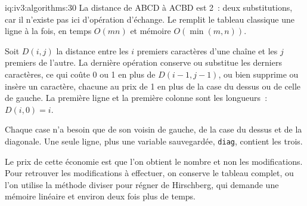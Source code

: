 \begin{solution}{iq:iv3:algorithms:30}
La distance de ABCD à ACBD est 2~: deux substitutions, car il n'existe pas ici d'opération d'échange. Le  remplit le tableau classique une ligne à la fois, en temps $O(mn)$ et mémoire $O(\min(m, n))$.
\label{lst:iv3:al:edit}

Soit $D(i, j)$ la distance entre les $i$ premiers caractères d'une chaîne et les $j$ premiers de l'autre. La dernière opération conserve ou substitue les derniers caractères, ce qui coûte 0 ou 1 en plus de $D(i - 1, j - 1)$, ou bien supprime ou insère un caractère, chacune au prix de 1 en plus de la case du dessus ou de celle de gauche. La première ligne et la première colonne sont les longueurs~: $D(i, 0) = i$.

Chaque case n'a besoin que de son voisin de gauche, de la case du dessus et de la diagonale. Une seule ligne, plus une variable sauvegardée, \texttt{diag}, contient les trois.

Le prix de cette économie est que l'on obtient le nombre et non les modifications. Pour retrouver les modifications à effectuer, on conserve le tableau complet, ou l'on utilise la méthode diviser pour régner de Hirschberg, qui demande une mémoire linéaire et environ deux fois plus de temps.

\end{solution}

